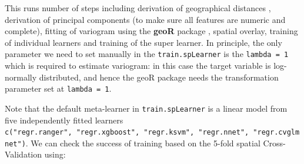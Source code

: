 \documentclass[
  graybox,natbib,nospthms]{svmono}
\newenvironment{Shaded}{\begin{snugshade}}{\end{snugshade}}
\newcommand{\CommentTok}[1]{\textcolor[rgb]{0.37,0.37,0.37}{\textit{#1}}}
\newcommand{\FunctionTok}[1]{\textcolor[rgb]{0,0,0}{#1}}
\newcommand{\NormalTok}[1]{#1}
\newcommand{\SpecialCharTok}[1]{\textcolor[rgb]{0,0,0}{#1}}
\begin{document}
This runs number of steps including derivation of geographical distances \citep{moller2020oblique},
derivation of principal components (to make sure all features are numeric and complete),
fitting of variogram using the \textbf{geoR} package \citep{Diggle2007Springer}, spatial overlay,
training of individual learners and training of the super learner. In principle, the only
parameter we need to set manually in the \texttt{train.spLearner} is the \texttt{lambda\ =\ 1}
which is required to estimate variogram: in this case the target variable is
log-normally distributed, and hence the geoR package needs the transformation
parameter set at \texttt{lambda\ =\ 1}.

Note that the default meta-learner in \texttt{train.spLearner} is a linear model from
five independently fitted learners \texttt{c("regr.ranger",\ "regr.xgboost",\ "regr.ksvm",\ "regr.nnet",\ "regr.cvglmnet")}. We can check the success of training based on the 5-fold
spatial Cross-Validation using:

\begin{Shaded}
\end{Shaded}
\end{document}
